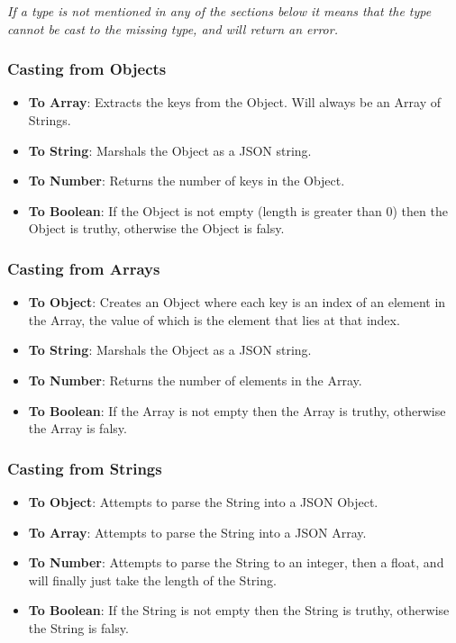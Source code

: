 \begin{center}
\textit{If a type is not mentioned in any of the sections below it means that the type cannot be cast to the missing type, and will return an error.}
\end{center}

\subsubsection{Casting from Objects}

\begin{itemize}
    \item \textbf{To Array}: Extracts the keys from the Object. Will always be an Array of Strings.
    \item \textbf{To String}: Marshals the Object as a JSON string.
    \item \textbf{To Number}: Returns the number of keys in the Object.
    \item \textbf{To Boolean}: If the Object is not empty (length is greater than 0) then the Object is truthy, otherwise the Object is falsy.
\end{itemize}

\subsubsection{Casting from Arrays}

\begin{itemize}
    \item \textbf{To Object}: Creates an Object where each key is an index of an element in the Array, the value of which is the element that lies at that index.
    \item \textbf{To String}: Marshals the Object as a JSON string.
    \item \textbf{To Number}: Returns the number of elements in the Array.
    \item \textbf{To Boolean}: If the Array is not empty then the Array is truthy, otherwise the Array is falsy.
\end{itemize}

\subsubsection{Casting from Strings}

\begin{itemize}
    \item \textbf{To Object}: Attempts to parse the String into a JSON Object.
    \item \textbf{To Array}: Attempts to parse the String into a JSON Array.
    \item \textbf{To Number}: Attempts to parse the String to an integer, then a float, and will finally just take the length of the String.
    \item \textbf{To Boolean}: If the String is not empty then the String is truthy, otherwise the String is falsy.
\end{itemize}

